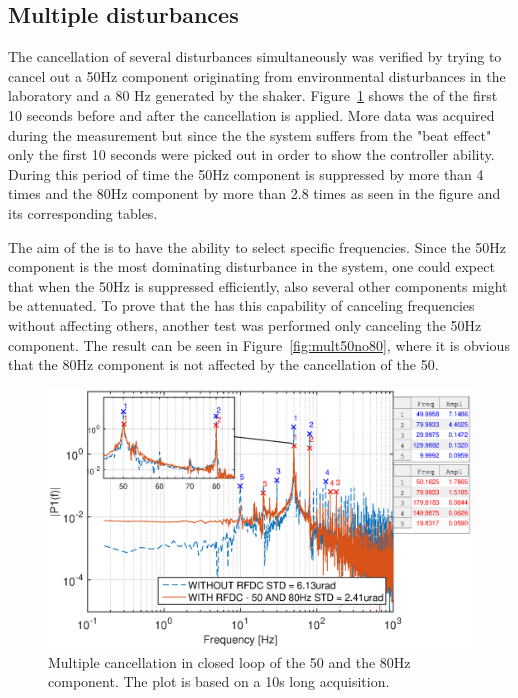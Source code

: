 \subsection{Multiple disturbances}
The cancellation of several disturbances simultaneously was verified by trying to cancel out a 50Hz component originating from environmental disturbances in the laboratory and a 80 Hz generated by the shaker. Figure~\ref{fig:mult5080} shows the \abbrFFT of the first 10 seconds before and after the cancellation is applied. More data was acquired during the measurement but since the the system suffers from the "beat effect" only the first 10 seconds were picked out in order to show the controller ability. During this period of time the 50Hz component is suppressed by more than 4 times and the 80Hz component by more than 2.8 times as seen in the figure and its corresponding tables.

The aim of the \abbrRFDC is to have the ability to select specific frequencies. Since the 50Hz component is the most dominating disturbance in the system, one could expect that when the 50Hz is suppressed efficiently, also several other components might be attenuated. To prove that the \abbrRFDC has this capability of canceling frequencies without affecting others, another test was performed only canceling the 50Hz component. The result can be seen in Figure~\ref{fig:mult50no80}, where it is obvious that the 80Hz component is not affected by the cancellation of the 50.

\begin{figure}[h]
  \centering %
  \includegraphics[width=1\textwidth]{fig/matlab/mult_50_80_closed_loop}
  \caption{\label{fig:mult5080} Multiple cancellation in closed loop of the 50 and the 80Hz component. The plot is based on a 10s long acquisition.}
\end{figure}

